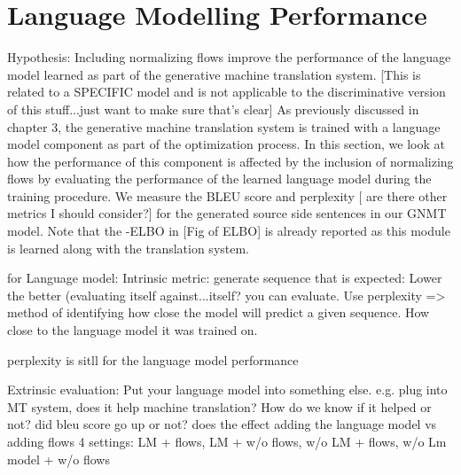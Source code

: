 \section{Language Modelling Performance}

Hypothesis: Including normalizing flows improve the performance of the language model learned as part of the generative machine translation system. [This is related to a SPECIFIC model and is not applicable to the discriminative version of this stuff...just want to make sure that's clear]
As previously discussed in chapter 3, the generative machine translation system is trained with a language model component as part of the optimization process. In this section, we look at how the performance of this component is affected by the inclusion of normalizing flows by evaluating the performance of the learned language model during the training procedure. We measure the BLEU score and perplexity  [ are there other metrics I should consider?] for the generated source side sentences in our GNMT model. Note that the -ELBO in [Fig of ELBO] is already reported as this module is learned along with the translation system.

for Language model:
Intrinsic metric: generate sequence that is expected: Lower the better (evaluating itself against...itself? you can evaluate. Use perplexity => method of identifying how close the model will predict a given sequence. How close to the language model it was trained on. 

perplexity is sitll for the language model performance

Extrinsic evaluation: Put your language model into something else. e.g. plug into MT system, does it help machine translation?
How do we know if it helped or not? did bleu score go up or not? 
does the effect adding the language model vs adding flows
4 settings: LM + flows, LM + w/o flows, w/o LM + flows, w/o Lm model + w/o flows


